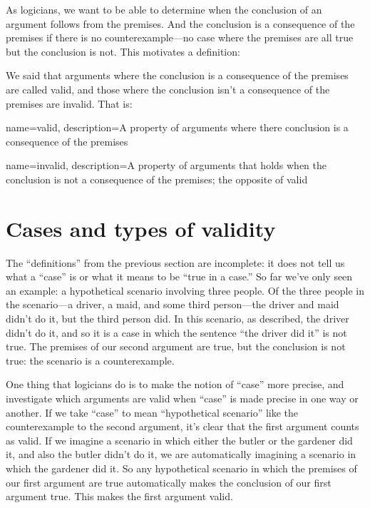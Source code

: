 As logicians, we want to be able to determine when the conclusion of an argument follows from the premises. And the conclusion is a consequence of the premises if there is no counterexample---no case where the premises are all true but the conclusion is not. 
This motivates a definition:


We said that arguments where the conclusion is a consequence of the premises are called valid, and those where the conclusion isn't a consequence of the premises are invalid. That is:



{
name=valid,
description={A property of arguments where there conclusion is a consequence of the premises}
}

{
name=invalid,
description={A property of arguments that holds when the conclusion is not a consequence of the premises; the opposite of \gls{valid}}
}

\section{Cases and types of validity}
The ``definitions'' from the previous section are incomplete: it does not tell us what a ``case'' is or what it means to be ``true in a case.''  So far we've only seen an example: a hypothetical scenario involving three people. Of the three people in the scenario---a driver, a maid, and some third person---the driver and maid didn't do it, but the third person did. In this scenario, as described, the driver didn't do it, and so it is a case in which the sentence ``the driver did it'' is not true. The premises of our second argument are true, but the conclusion is not true: the scenario is a counterexample.

One thing that logicians do is to make the notion of ``case'' more precise, and investigate which arguments are valid when ``case'' is made precise in one way or another. If we take ``case'' to mean ``hypothetical scenario'' like the counterexample to the second argument, it's clear that the first argument counts as valid. If we imagine a scenario in which either the butler or the gardener did it, and also the butler didn't do it, we are automatically imagining a scenario in which the gardener did it. So any hypothetical scenario in which the premises of our first argument are true automatically makes the conclusion of our first argument true. This makes the first argument valid. 

